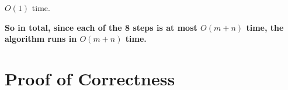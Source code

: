 \documentclass{article}
\begin{document}
$O(1)$ time.

\textbf{So in total, since each of the 8 steps is at most $O(m+n)$ time, the algorithm runs in $O(m+n)$ time.}




\section{Proof of Correctness}
\end{document}
